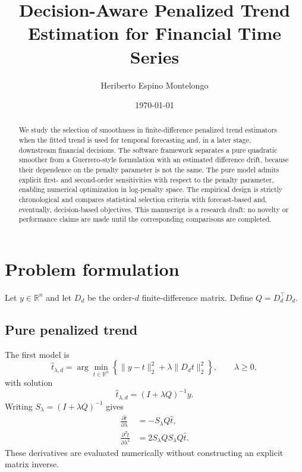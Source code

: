 \documentclass[11pt]{article}
\title{Decision-Aware Penalized Trend Estimation for Financial Time Series}
\author{Heriberto Espino Montelongo}
\date{\today}
\newcommand{\R}{\mathbb{R}}
\newcommand{\Dt}{D_d}
\begin{document}
\maketitle

\begin{abstract}
We study the selection of smoothness in finite-difference penalized trend
estimators when the fitted trend is used for temporal forecasting and, in a
later stage, downstream financial decisions. The software framework separates
a pure quadratic smoother from a Guerrero-style formulation with an estimated
difference drift, because their dependence on the penalty parameter is not the
same. The pure model admits explicit first- and second-order sensitivities with
respect to the penalty parameter, enabling numerical optimization in
log-penalty space. The empirical design is strictly chronological and compares
statistical selection criteria with forecast-based and, eventually,
decision-based objectives. This manuscript is a research draft: no novelty or
performance claims are made until the corresponding comparisons are completed.
\end{abstract}

\section{Problem formulation}
Let $y\in\R^n$ and let $\Dt$ be the order-$d$ finite-difference matrix. Define
$Q=\Dt^\top\Dt$.

\subsection{Pure penalized trend}
The first model is
\begin{equation}
\widehat t_{\lambda,d}
=\arg\min_{t\in\R^n}\left\{\|y-t\|_2^2+\lambda\|\Dt t\|_2^2\right\},
\qquad \lambda\ge 0,
\end{equation}
with solution
\begin{equation}
\widehat t_{\lambda,d}=(I+\lambda Q)^{-1}y.
\end{equation}
Writing $S_\lambda=(I+\lambda Q)^{-1}$ gives
\begin{align}
\frac{\partial \widehat t}{\partial\lambda}
&=-S_\lambda Q\widehat t,\\
\frac{\partial^2 \widehat t}{\partial\lambda^2}
&=2S_\lambda Q S_\lambda Q\widehat t.
\end{align}
These derivatives are evaluated numerically without constructing an explicit
matrix inverse.
\end{document}

